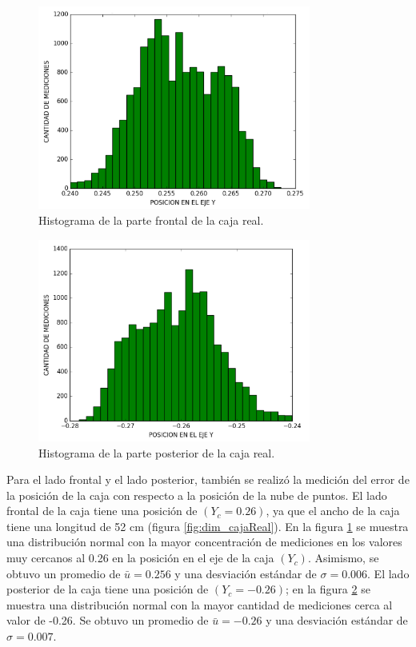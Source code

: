 \begin{figure}
  \centering \footnotesize
  \includegraphics[width=0.80\textwidth]{images/hist_frontal_caja.png}
  \captionsetup{font=footnotesize}
  \caption{Histograma de la parte frontal de la caja real.}
  \label{fig:hist_Front}
\end{figure}

\begin{figure}
  \centering \footnotesize
  \includegraphics[width=0.80\textwidth]{images/hist_posterior_caja.png}
  \captionsetup{font=footnotesize}
  \caption{Histograma de la parte posterior de la caja real.}
  \label{fig:hist_Post}
\end{figure}

Para el lado frontal y el lado posterior, también se realizó la medición del error de la
posición de la caja con respecto a la posición de la nube de puntos. El lado frontal de la
caja tiene una posición de $(Y_{c} = 0.26)$, ya que el ancho de la caja tiene una longitud
de 52 cm (figura \ref{fig:dim_cajaReal}). En la figura \ref{fig:hist_Front} se muestra una 
distribución normal con la mayor concentración de mediciones en los valores muy cercanos al 
0.26 en la posición en el eje de la caja $(Y_{c})$. Asimismo, se obtuvo un promedio de $\bar{u} 
= 0.256$ y una desviación estándar de $\sigma = 0.006$. El lado posterior de la caja tiene 
una posición de $(Y_{c} = -0.26)$; en la figura \ref{fig:hist_Post} se muestra una distribución
normal con la mayor cantidad de mediciones cerca al valor de -0.26. Se obtuvo un promedio de 
$\bar{u} = -0.26$ y una desviación estándar de $\sigma = 0.007$.

